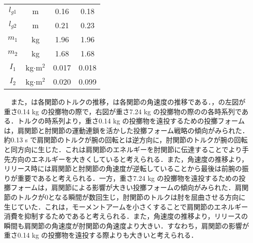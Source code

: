 \begin{small}
\begin{table}[tb]
\begin{center}
{\begin{tabular}{c|c|c|c}
      $l_{g1}$ & m & 0.16 & 0.18 \\
      $l_{g2}$ & m & 0.21 & 0.23 \\
      $m_{1}$ & kg & 1.96 & 1.96\\
      $m_{2}$ & kg & 1.68 & 1.68\\
      $I_{1}$ & kg$\cdot$$\mathrm{m}^2$ & 0.017 & 0.018 \\
      $I_{2}$ & kg$\cdot$$\mathrm{m}^2$ & 0.020 & 0.099 \\
      \hline
    \end{tabular}
    }
  \end{center}
\end{table}
　また，は各関節のトルクの推移，は各関節の角速度の推移である．，の左図が重さ0.14 kg の投擲物の際で，右図が重さ7.24 kg の投擲物の際のの各時系列である．トルクの時系列より，重さ0.14 kg の投擲物を遠投するための投擲フォームは，肩関節と肘関節の運動連鎖を活かした投擲フォーム戦略の傾向がみられた．約0.13 s で肩関節のトルクが腕の回転とは逆方向に，肘関節のトルクが腕の回転と同方向に生じた．これは肩関節のエネルギーを肘関節に伝達することでより手先方向のエネルギーを大きくしていると考えられる．また，角速度の推移より，リリース時には肩関節と肘関節の角速度が逆転していることから最後は前腕の振りが重要であると考えられる．一方，重さ7.24 kg の投擲物を遠投するための投擲フォームは，肩関節による影響が大きい投擲フォームの傾向がみられた．肩関節のトルクが0となる瞬間が数回生じ，肘関節のトルクは肘を屈曲させる方向に生じていた．これは，モーメントアームを小さくすることで肩関節のエネルギー消費を抑制するためであると考えられる．また，角速度の推移より，リリースの瞬間も肩関節の角速度が肘関節の角速度より大きい．すなわち，肩関節の影響が重さ0.14 kg の投擲物を遠投する際よりも大きいと考えられる．

\end{small}
